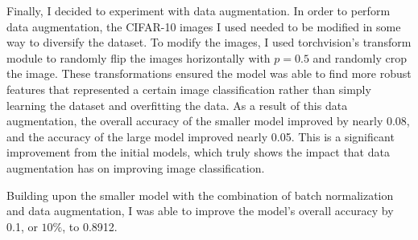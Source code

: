 \documentclass[11pt,a4paper]{article}
\begin{document}
Finally, I decided to experiment with data augmentation. In order to perform data augmentation, the CIFAR-10 images I used needed
 to be modified in some way to diversify the dataset. To modify the images, I used torchvision's transform module to randomly flip 
 the images horizontally with $p=0.5$ and randomly crop the image. These transformations ensured the model was able to find more robust 
 features that represented a certain image classification rather than simply learning the dataset and overfitting the data. As a 
 result of this data augmentation, the overall accuracy of the smaller model improved by nearly 0.08, and the accuracy of the large 
 model improved nearly 0.05. This is a significant improvement from the initial models, which truly shows the impact that data 
 augmentation has on improving image classification.

Building upon the smaller model with the combination of batch normalization and data augmentation, I was able to improve the
 model's overall accuracy by 0.1, or $10\%$, to 0.8912.


\printbibliography
\end{document}
